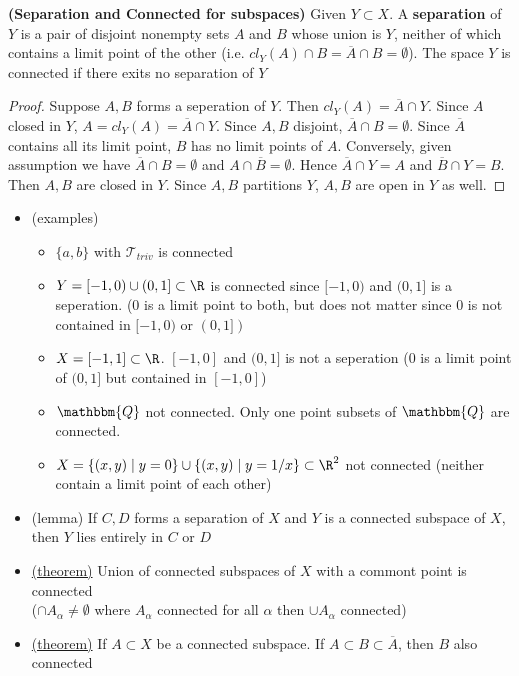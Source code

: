 \documentclass[10.5pt]{article}
\newcommand{\calT}{\mathcal{T}}
\newcommand{\Q}{\mathbbm{Q}}
\begin{document}
\begin{defn*}
    \textbf{(Separation and Connected for subspaces)} Given $Y\subset X$. A \textbf{separation} of $Y$ is a pair of disjoint nonempty sets $A$ and $B$ whose union is $Y$, neither of which contains a limit point of the other (i.e. $cl_Y(A) \cap B = \overline{A} \cap B = \emptyset$). The space $Y$ is connected if there exits no separation of $Y$
    \begin{proof}
        Suppose $A,B$ forms a seperation of $Y$. Then $cl_Y(A) = \overline{A}\cap Y$. Since $A$ closed in $Y$, $A=cl_Y(A) = \overline{A}\cap Y$. Since $A,B$ disjoint, $\overline{A} \cap B = \emptyset$. Since $\overline{A}$ contains all its limit point, $B$ has no limit points of $A$. Conversely, given assumption we have $\overline{A} \cap B = \emptyset$ and $A\cap \overline{B} = \emptyset$. Hence $\overline{A} \cap Y = A$ and $\overline{B} \cap Y = B$. Then $A,B$ are closed in $Y$. Since $A,B$ partitions $Y$, $A,B$ are open in $Y$ as well.
    \end{proof}
    \begin{itemize}
        \item (examples)
        \begin{itemize}
            \item $\{a,b\}$ with $\calT_{triv}$ is connected
            \item $Y=[-1,0)\cup (0,1] \subset \R$ is connected since $[-1,0)$ and $(0,1]$ is a seperation. ($0$ is a limit point to both, but does not matter since $0$ is not contained in $[-1,0)$ or $(0,1])$
            \item $X=[-1,1]\subset\R$. $[-1,0]$ and $(0,1]$ is not a seperation ($0$ is a limit point of $(0,1]$ but contained in $[-1,0]$)
            \item $\Q$ not connected. Only one point subsets of $\Q$ are connected.
            \item $X = \{(x,y) \mid y=0\} \cup \{(x,y) \mid y = 1/x \} \subset \R^2$ not connected (neither contain a limit point of each other)
        \end{itemize}
        \item (lemma) If $C,D$ forms a separation of $X$ and $Y$ is a connected subspace of $X$, then $Y$ lies entirely in $C$ or $D$
        \item \underline{(theorem)} Union of connected subspaces of $X$ with a commont point is connected  \\ 
        ($\textstyle \cap A_{\alpha} \neq \emptyset$ where $A_{\alpha}$ connected for all $\alpha$ then $\textstyle \cup A_{\alpha}$ connected)
        \item \underline{(theorem)} If $A\subset X$ be a connected subspace. If $A\subset B \subset \overline{A}$, then $B$ also connected
    \end{itemize}
\end{defn*}
\end{document}
